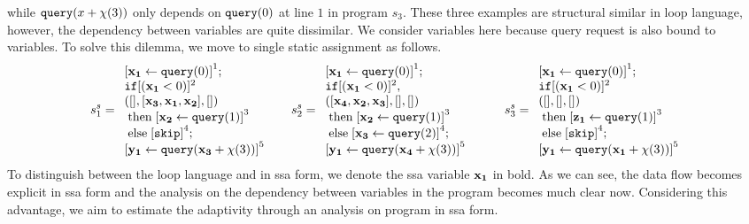 \documentclass[a4paper,11pt]{article}
\begin{document}
{while ${\tt query}(x+\chi(3))$ only depends on ${\tt query}(0)$ at line $1$ in program $s_3$. 
These three examples are structural similar in loop language, however, the dependency between variables are quite dissimilar. We consider variables here because query request is also bound to variables. To solve this dilemma, we move to single static assignment as follows.   
\[
 s_1^{s} = \begin{array}{l}
      \clabel{ \assign{{\ssa{x_1}}}{\query(0)}}^{1} ; \\
      \eif  [({\ssa{x_1} }< 0 )]^{2}\\
      ([], [{ \ssa{x_3, x_1,x_2} }], []) \\
      \ethen \clabel{\assign{{\ssa{x_2}}}{\query(1)}}^{3}\\
      \eelse \clabel{\eskip}^{4} ; \\
      \clabel{\assign{{\ssa{y_1}}}{\query({\ssa{x_3} + \chi(3)})}}^{5}
 \end{array}
 ~~~~~
  s_2^{s} = \begin{array}{l}
      \clabel{ \assign{{\ssa{x_1}}}{\query(0)}}^{1} ; \\
      \eif  [({\ssa{x_1}} < 0 )]^{2}, \\
      ( [{\ssa{x_4, x_2,x_3}}], [], [] ) \\
      \ethen \clabel{\assign{{\ssa{x_2}}}{\query(1)}}^{3}\\
      \eelse \clabel{\assign{{\ssa{x_3}}}{\query(2)}}^{4} ; \\
      \clabel{\assign{{\ssa{y_1}}}{\query({\ssa{x_4}}+\chi(3))}}^{5}
 \end{array}
 ~~~~~~~~
  s_3^{s} = \begin{array}{l}
      \clabel{ \assign{{\ssa{x_1}}}{\query(0)}}^{1} ; \\
      \eif  [({\ssa{x_1}} < 0 )]^{2} \\
       ( [], [], [] ) \\
      \ethen \clabel{\assign{{\ssa{z_1}}}{\query(1)}}^{3}\\
      \eelse \clabel{\eskip}^{4} ; \\
      \clabel{\assign{{\ssa{y_1}}}{\query({\ssa{x_1}}+\chi(3))}}^{5}
 \end{array}
\]
To distinguish between the loop language and in ssa form, we denote the ssa variable ${\mathbf{{x_1}}}$ in bold. As we can see, the data flow becomes explicit in ssa form and the analysis on the dependency between variables in the program becomes much clear now. Considering this advantage, we aim to estimate the adaptivity through an analysis on program in ssa form. 
}
%
\end{document}
